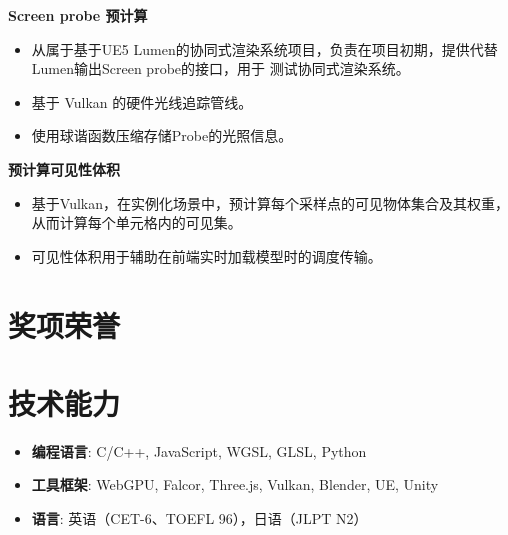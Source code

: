 \documentclass{resume}
\begin{document}
\textbf{Screen probe 预计算}
\begin{itemize}
  \item 从属于基于UE5 Lumen的协同式渲染系统项目，负责在项目初期，提供代替Lumen输出Screen probe的接口，用于
  测试协同式渲染系统。
  \item 基于 Vulkan 的硬件光线追踪管线。
  \item 使用球谐函数压缩存储Probe的光照信息。
\end{itemize}

\textbf{预计算可见性体积}
\begin{itemize}
  \item 基于Vulkan，在实例化场景中，预计算每个采样点的可见物体集合及其权重，从而计算每个单元格内的可见集。
  \item 可见性体积用于辅助在前端实时加载模型时的调度传输。
\end{itemize}

\section{奖项荣誉}
\vspace{12pt}
\section{技术能力}
\begin{itemize}[parsep=0.2ex]
  \item \textbf{编程语言}: C/C++, JavaScript, WGSL, GLSL, Python
  \item \textbf{工具框架}: WebGPU, Falcor, Three.js, Vulkan, Blender, UE, Unity
  \item \textbf{语言}: 英语（CET-6、TOEFL 96），日语（JLPT N2）
\end{itemize}
\end{document}
